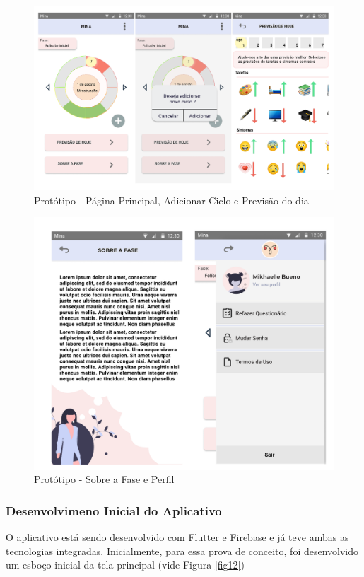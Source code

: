 \begin{figure}[ht]
	\centering
	\includegraphics[keepaspectratio=true,scale=0.4]{figuras/prototipo2.pdf}
	\caption{Protótipo - Página Principal, Adicionar Ciclo e Previsão do dia}
        \label{fig10}
\end{figure}



\begin{figure}[ht]
	\centering
	\includegraphics[keepaspectratio=true,scale=0.4]{figuras/prototipo3.pdf}
	\caption{Protótipo - Sobre a Fase e Perfil}
        \label{fig11}
\end{figure}


\subsubsection{Desenvolvimeno Inicial do Aplicativo}
O aplicativo está sendo desenvolvido com Flutter e Firebase e 
já teve 
ambas as tecnologias integradas. Inicialmente, para essa prova 
de conceito, 
foi desenvolvido um esboço inicial da tela principal (vide 
Figura \ref{fig12})

